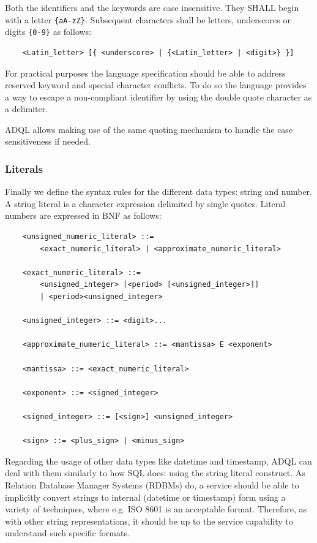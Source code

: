 \documentclass[11pt,a4paper]{ivoa}
\begin{document}
Both the identifiers and the keywords are case insensitive. They SHALL
begin with a letter \verb:{aA-zZ}:. Subsequent characters shall be letters,
underscores or digits \verb:{0-9}: as follows:

\begin{verbatim}
    <Latin_letter> [{ <underscore> | {<Latin_letter> | <digit>} }]
\end{verbatim}

For practical purposes the language specification should be able to address
reserved keyword and special character conflicts. To do so the language
provides a way to escape a non-compliant identifier by using the double
quote character as a delimiter.

ADQL allows making use of the same quoting mechanism to handle the case
sensitiveness if needed.

\subsubsection{Literals}

Finally we define the syntax rules for the different data types: string and number. A string literal is a character expression delimited by single quotes. Literal numbers are expressed in BNF as follows:

\begin{verbatim}
    <unsigned_numeric_literal> ::=
        <exact_numeric_literal> | <approximate_numeric_literal>

    <exact_numeric_literal> ::=
        <unsigned_integer> [<period> [<unsigned_integer>]]
        | <period><unsigned_integer>

    <unsigned_integer> ::= <digit>...

    <approximate_numeric_literal> ::= <mantissa> E <exponent>

    <mantissa> ::= <exact_numeric_literal>

    <exponent> ::= <signed_integer>

    <signed_integer> ::= [<sign>] <unsigned_integer>

    <sign> ::= <plus_sign> | <minus_sign>
\end{verbatim}

Regarding the usage of other data types like datetime and timestamp, ADQL
can deal with them similarly to how SQL does: using the string literal
construct. As Relation Database Manager Systems (RDBMs) do, a service should
be able to implicitly convert strings to internal (datetime or timestamp)
form using a variety of techniques, where e.g. ISO 8601 is an acceptable
format. Therefore, as with other string representations, it should be up to
the service capability to understand such specific formats.
\end{document}

